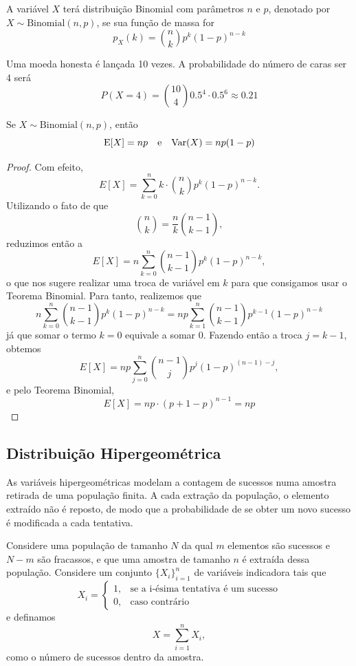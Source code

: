 \begin{def:modelo binomial}
A variável $X$ terá distribuição Binomial com parâmetros $n$ e $p$, denotado por
$X \sim \mathrm{Binomial}(n,p)$, se sua função de massa for
\[
    p_X(k) = \binom{n}{k} p^k(1-p)^{n-k}
\]
\end{def:modelo binomial}

\begin{exp:binomial 1}
Uma moeda honesta é lançada 10 vezes.
A probabilidade do número de caras ser 4 será
\[
    P(X = 4) = \binom{10}{4} 0.5^4 \cdot 0.5^{6} \approx 0.21
\]
\end{exp:binomial 1}

\begin{prop:esperanca binomial}
Se $X \sim \mathrm{Binomial}(n, p)$, então
\[
    \mathrm{E}\!\left[X\right] = np \quad \text{e} \quad \mathrm{Var}\!\left(X\right) = np(1-p)
\]
\end{prop:esperanca binomial}
\begin{proof}
Com efeito,
	\[
		E[X] = \sum_{k=0}^n k \cdot \binom{n}{k} p^k (1-p)^{n-k}.
	\]
	Utilizando o fato de que
	\[
		\binom{n}{k} = \frac{n}{k} \binom{n-1}{k-1},
	\]
	reduzimos então a
	\[
		E[X] = n\sum_{k=0}^n \binom{n-1}{k-1} p^k (1-p)^{n-k},
	\]
	o que nos sugere realizar uma troca de variável em $k$ para que consigamos usar o
	Teorema Binomial. Para tanto, realizemos que
	\[
		n\sum_{k=0}^n \binom{n-1}{k-1} p^k (1-p)^{n-k} = np \sum_{k=1}^n\binom{n-1}{k-1}p^{k-1}(1-p)^{n-k}
	\]
	já que somar o termo $k=0$ equivale a somar 0. Fazendo então a troca $j = k - 1$, obtemos
	\[
		E[X] = np \sum_{j=0}^n\binom{n-1}{j}p^{j}(1-p)^{(n-1)-j},
	\]
	e pelo Teorema Binomial,
	\[
		E[X] = np \cdot (p + 1 - p)^{n-1} = np
	\]
\end{proof}

\subsection{Distribuição Hipergeométrica}

As variáveis hipergeométricas modelam a contagem de sucessos numa amostra retirada de uma
população finita.
A cada extração da população, o elemento extraído não é reposto, de modo que a
probabilidade de se obter um novo sucesso é modificada a cada tentativa.

Considere uma população de tamanho $N$ da qual $m$ elementos são sucessos e $N-m$ são
fracassos, e que uma amostra de tamanho $n$ é extraída dessa população.
Considere um conjunto $\{X_i\}_{i=1}^n$ de variáveis indicadora tais que
\[
    X_i = \begin{cases}
        1,&\text{se a i-ésima tentativa é um sucesso}\\
        0,&\text{caso contrário}
    \end{cases}
\]
e definamos
\[
    X = \sum_{i=1}^n X_i,
\]
como o número de sucessos dentro da amostra.

